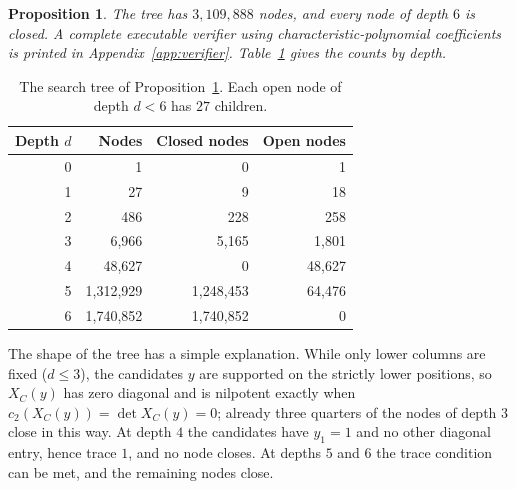 \documentclass[screen]{aomart}
\newtheorem{proposition}[theorem]{Proposition}
\theoremstyle{definition}
\theoremstyle{remark}
\numberwithin{equation}{section}
\begin{document}
\begin{proposition}\label{prop:tree}
The tree has $3{,}109{,}888$ nodes, and every node of depth $6$ is closed. A complete executable verifier using characteristic-polynomial coefficients is printed in Appendix~\ref{app:verifier}. Table~\ref{tab:tree} gives the counts by depth.
\end{proposition}

\begin{table}[ht]
\centering
\begin{tabular}{@{}rrrr@{}}
\toprule
Depth $d$ & Nodes & Closed nodes & Open nodes\\
\midrule
0 & 1 & 0 & 1\\
1 & 27 & 9 & 18\\
2 & 486 & 228 & 258\\
3 & 6,966 & 5,165 & 1,801\\
4 & 48,627 & 0 & 48,627\\
5 & 1,312,929 & 1,248,453 & 64,476\\
6 & 1,740,852 & 1,740,852 & 0\\
\bottomrule
\end{tabular}
\medskip
\caption{The search tree of Proposition~\ref{prop:tree}. Each open node of depth $d<6$ has $27$ children.}
\label{tab:tree}
\end{table}



The shape of the tree has a simple explanation. While only lower columns are fixed ($d\le3$), the candidates $y$ are supported on the strictly lower positions, so $X_C(y)$ has zero diagonal and is nilpotent exactly when $c_2(X_C(y))=\det X_C(y)=0$; already three quarters of the nodes of depth $3$ close in this way. At depth $4$ the candidates have $y_1=1$ and no other diagonal entry, hence trace $1$, and no node closes. At depths $5$ and $6$ the trace condition can be met, and the remaining nodes close.
\end{document}
